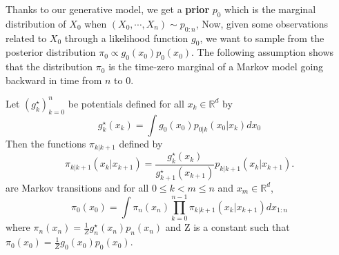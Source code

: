 \documentclass[12pt]{article}
\begin{document}
Thanks to our generative model, we get a \textbf{prior} $p_0$ 
which is the marginal distribution of $X_0$ when $(X_0, \cdots, X_n) \sim p_{0:n}$,
Now, given some observations related to $X_0$ through a likelihood function $g_0$,
we want to sample from the posterior distribution $\pi_0 \propto g_0(x_0) p_0(x_0)$.
The following assumption shows that the distribution $\pi_0$ is the time-zero marginal of a Markov model
going backward in time from $n$ to $0$.

\begin{assumption}
    \label{ass:posterior_markov_backward}
    Let $(g_k^\star)_{k=0}^n$ be potentials defined for all $x_k \in \mathbb{R}^d$ by
    \begin{equation}
    g_k^\star (x_k) = \int g_0(x_0) p_{0|k}(x_0 | x_k) dx_0
    \end{equation}
    Then the functions $\pi_{k|k+1}$ defined by
    $$\pi_{k|k+1}(x_k | x_{k+1}) = \frac{g_k^\star(x_k)}{g_{k+1}^\star(x_{k+1})} p_{k|k+1}(x_k | x_{k+1}).$$
    are Markov transitions and for all $0 \leq k < m \leq n$ and $x_m \in \mathbb{R}^d$,
    $$\pi_0(x_0) = \int \pi_n(x_n) \prod_{k=0}^{n-1} \pi_{k|k+1}(x_k | x_{k+1}) dx_{1:n}$$ where
    $\pi_n(x_n) = \frac{1}{Z} g_n^\star(x_n) p_n(x_n)$ and
    Z is a constant such that $\pi_0(x_0) = \frac{1}{Z} g_0(x_0) p_0(x_0)$.
\end{assumption}
\end{document}
